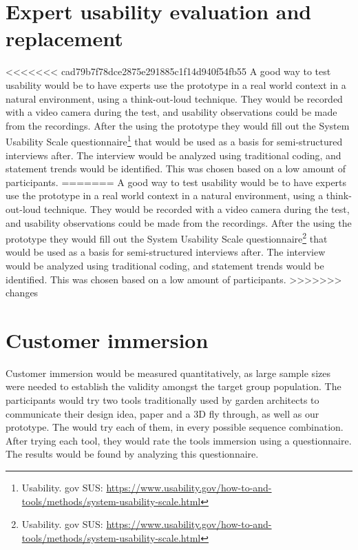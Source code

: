 \section{Expert usability evaluation and replacement}
<<<<<<< cad79b7f78dce2875e291885c1f14d940f54fb55
A good way to test usability would be to have experts use the prototype in a real world context in a natural environment, using a think-out-loud technique. They would be recorded with a video camera during the test, and usability observations could be made from the recordings. After the using the prototype they would fill out the System Usability Scale questionnaire\footnote{Usability. gov SUS:  \url{https://www.usability.gov/how-to-and-tools/methods/system-usability-scale.html}} that would be used as a basis for semi-structured interviews after. The interview would be analyzed using traditional coding, and statement trends would be identified. This was chosen based on a low amount of participants.
=======
A good way to test usability would be to have experts use the prototype in a real world context in a natural environment, using a think-out-loud technique. They would be recorded with a video camera during the test, and usability observations could be made from the recordings. After the using the prototype they would fill out the System Usability Scale questionnaire\footnote{Usability. gov SUS: \url{https://www.usability.gov/how-to-and-tools/methods/system-usability-scale.html}} that would be used as a basis for semi-structured interviews after. The interview would be analyzed using traditional coding, and statement trends would be identified. This was chosen based on a low amount of participants.
>>>>>>> changes

\section{Customer immersion}
Customer immersion would be measured quantitatively, as large sample sizes were needed to establish the validity amongst the target group population. The participants would try two tools traditionally used by garden architects to communicate their design idea, paper and a 3D fly through, as well as our prototype. The would try each of them, in every possible sequence combination. After trying each tool, they would rate the tools immersion using a questionnaire. The results would be found by analyzing this questionnaire.